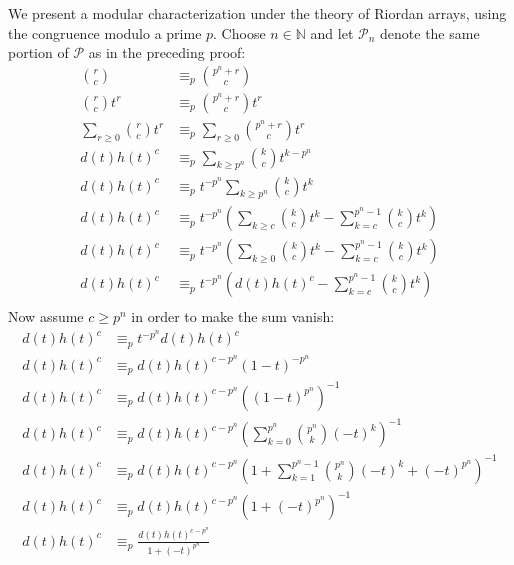 \documentclass[10pt,a4paper]{article} %
\begin{document}
    We present a modular characterization under the theory of Riordan arrays, using the
    congruence modulo a prime $p$. Choose $n\in\mathbb{N}$ and let $\mathcal{P}_n$ denote the
    same portion of $\mathcal{P}$ as in the preceding proof:
      \begin{displaymath}
          \begin{split}
                {{r} \choose {c}} &\equiv_p {{p^n+r} \choose {c}} \\
                {{r} \choose {c}}t^r &\equiv_p {{p^n+r} \choose {c}}t^r \\
                \sum_{r\geq 0}{{{r} \choose {c}}t^r} &\equiv_p \sum_{r\geq 0}{{{p^n+r} \choose {c}}t^r} \\
                d(t)h(t)^{c} &\equiv_p \sum_{k\geq p^n}{{{k} \choose {c}}t^{k-p^n}} \\
                d(t)h(t)^{c} &\equiv_p t^{-p^n}\sum_{k\geq p^n}{{{k} \choose {c}}t^{k}} \\
                d(t)h(t)^{c} &\equiv_p t^{-p^n}\left(
                    \sum_{k\geq c}{{{k} \choose {c}}t^{k}}-\sum_{k=c}^{p^n -1}{{{k} \choose {c}}t^{k}}\right) \\
                d(t)h(t)^{c} &\equiv_p t^{-p^n}\left(
                    \sum_{k\geq 0}{{{k} \choose {c}}t^{k}}-\sum_{k=c}^{p^n -1}{{{k} \choose {c}}t^{k}}\right) \\
                d(t)h(t)^{c} &\equiv_p t^{-p^n}\left(d(t)h(t)^{c} -\sum_{k=c}^{p^n -1}{{{k} \choose {c}}t^{k}}\right) \\
          \end{split}
      \end{displaymath}
    Now assume $c \geq p^n$ in order to make the sum vanish:
      \begin{displaymath}
          \begin{split}
                d(t)h(t)^{c} &\equiv_p t^{-p^n} d(t)h(t)^{c} \\
                d(t)h(t)^{c} &\equiv_p d(t)h(t)^{c-p^n} (1-t)^{-p^n} \\
                d(t)h(t)^{c} &\equiv_p d(t)h(t)^{c-p^n}\left( (1-t)^{p^n}\right)^{-1} \\
                d(t)h(t)^{c} &\equiv_p d(t)h(t)^{c-p^n}\left(\sum_{k=0}^{p^n}{{{p^n} \choose {k}}(-t)^k } \right)^{-1}\\
                d(t)h(t)^{c} &\equiv_p d(t)h(t)^{c-p^n}\left(
                    1 + \sum_{k=1}^{p^n -1}{{{p^n} \choose {k}}(-t)^k +(-t)^{p^n} }\right)^{-1} \\
                d(t)h(t)^{c} &\equiv_p d(t)h(t)^{c-p^n}\left(1 + (-t)^{p^n}\right)^{-1} \\
                d(t)h(t)^{c} &\equiv_p \frac{d(t)h(t)^{c-p^n}}{1 + (-t)^{p^n}} \\
          \end{split}
      \end{displaymath}
\end{document}
